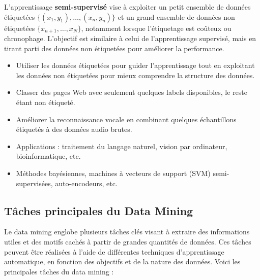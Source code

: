 \documentclass[a4paper,12pt]{article}
\begin{document}
        L'apprentissage \textbf{semi-supervisé} vise à exploiter un petit ensemble de données étiquetées \(\{(x_1, y_1), \ldots, (x_n, y_n)\}\) et un grand ensemble de données non étiquetées \(\{x_{n+1}, \ldots, x_N\}\), notamment lorsque l’étiquetage est coûteux ou chronophage. L’objectif est similaire à celui de l’apprentissage supervisé, mais en tirant parti des données non étiquetées pour améliorer la performance.
        
        
        \begin{itemize}
            \item  Utiliser les données étiquetées pour guider l’apprentissage tout en exploitant les données non étiquetées pour mieux comprendre la structure des données.
        \end{itemize}
        
        
        \begin{itemize}
            \item  Classer des pages Web avec seulement quelques labels disponibles, le reste étant non étiqueté.
            \item  Améliorer la reconnaissance vocale en combinant quelques échantillons étiquetés à des données audio brutes.
            \item  Applications : traitement du langage naturel, vision par ordinateur, bioinformatique, etc.
        \end{itemize}
        
        
        \begin{itemize}
            \item Méthodes bayésiennes, machines à vecteurs de support (SVM) semi-supervisées, auto-encodeurs, etc.
        \end{itemize}
    
      \subsection{Tâches principales du Data Mining}
        Le data mining englobe plusieurs tâches clés visant à extraire des informations utiles et des motifs cachés à partir de grandes quantités de données. Ces tâches peuvent être réalisées à l'aide de différentes techniques d'apprentissage automatique, en fonction des objectifs et de la nature des données. Voici les principales tâches du data mining :
        
\end{document}

